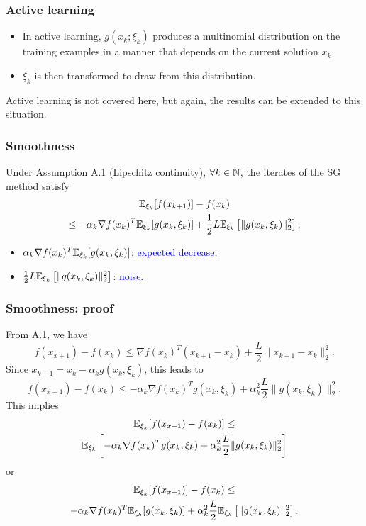 \documentclass{beamer}
\begin{document}
\begin{frame}
\frametitle{Active learning}

\begin{itemize}
\item 
In active learning, $g(x_k; \xi_k)$ produces a multinomial
distribution on the training examples in a manner that depends on the current solution $x_k$.
\item
$\xi_k$ is then transformed to draw from this distribution.
\end{itemize}

Active learning is not covered here, but again, the results can be extended to this situation.

\end{frame}

\begin{frame}
\frametitle{Smoothness}

\begin{theorem}
Under Assumption A.1 (Lipschitz continuity), $\forall k \in {\mathbb{N}}$, the iterates of the SG method satisfy
\begin{multline*}
{\mathbb{E}}_{\xi_k}[f(x_{k+1})] - f(x_k)
\\ \leq
-\alpha_k \nabla f(x_k)^T{\mathbb{E}}_{\xi_k}[g(x_k,\xi_k)]
+\frac{1}{2} L {\mathbb{E}}_{\xi_k} \left[ \| g(x_k, \xi_k )\|_2^2 \right].
\end{multline*}
\end{theorem}
\begin{itemize}
	\item $\alpha_k \nabla f(x_k)^T{\mathbb{E}}_{\xi_k}[g(x_k,\xi_k)]$: \textcolor{blue}{expected decrease};
	\item $\frac{1}{2} L {\mathbb{E}}_{\xi_k} \left[ \| g(x_k, \xi_k )\|_2^2 \right]$: \textcolor{blue}{noise}.
\end{itemize}

\end{frame}

\begin{frame}
	\frametitle{Smoothness: proof}
	
	From A.1, we have
	$$
	f(x_{x+1}) - f(x_k) \leq \nabla f(x_k)^T (x_{k+1} - x_k) + \frac{L}{2} \| x_{k+1} - x_k \|^2_2.
	$$
	Since $x_{k+1} = x_k - \alpha_k g(x_k, \xi_k)$, this leads to
	$$
	f(x_{x+1}) - f(x_k) \leq - \alpha_k \nabla f(x_k)^T g(x_k, \xi_k) + \alpha_k^2 \frac{L}{2} \| g(x_k, \xi_k) \|^2_2.
	$$
	This implies
	\begin{multline*}
		{\mathbb{E}}_{\xi_k} [f(x_{x+1}) - f(x_k)] \leq \\ {\mathbb{E}}_{\xi_k} \left[ - \alpha_k \nabla f(x_k)^T g(x_k, \xi_k) + \alpha_k^2 \frac{L}{2} \| g(x_k, \xi_k) \|^2_2 \right]
	\end{multline*}
	or
	\begin{multline*}
		{\mathbb{E}}_{\xi_k} [f(x_{x+1})] - f(x_k) \leq \\ - \alpha_k \nabla f(x_k)^T {\mathbb{E}}_{\xi_k} [ g(x_k, \xi_k) ] + \alpha_k^2 \frac{L}{2} {\mathbb{E}}_{\xi_k} \left[ \| g(x_k, \xi_k) \|^2_2 \right].	
	\end{multline*}
	
	\begin{align*}
	\end{align*}
	
\end{frame}
\end{document}
